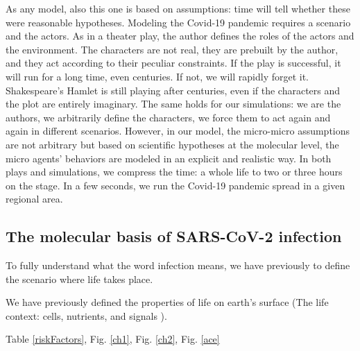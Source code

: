 \documentclass[graybox]{svmult}
\begin{document}
As any model, also this one is based on assumptions: time will tell whether these were reasonable hypotheses. Modeling the Covid-19 pandemic requires a scenario and the actors. As in a theater play, the author defines the roles of the actors and the environment. The characters are not real, they are prebuilt by the author, and they act according to their peculiar constraints. If the play is successful, it will run for a long time, even centuries. If not, we will rapidly forget it. Shakespeare’s Hamlet is still playing after centuries, even if the characters and the plot are entirely imaginary. The same holds for our simulations: we are the authors, we arbitrarily define the characters, we force them to act again and again in different scenarios. However, in our model, the micro-micro assumptions are not arbitrary but based on scientific hypotheses at the molecular level, the micro agents’ behaviors are modeled in an explicit and realistic way. In both plays and simulations, we compress the time: a whole life to two or three hours on the stage. In a few seconds, we run the Covid-19 pandemic spread in a given regional area.



\subsection{The molecular basis of SARS-CoV-2 infection}
\label{biochem}

To fully understand what the word infection means, we have previously to define the scenario where life takes place.

We have previously defined the properties of life on earth's surface (The life context: cells, nutrients, and signals \cite{pescarmona2002life}).

Table \ref{riskFactors}, Fig. \ref{ch1}, Fig. \ref{ch2}, Fig. \ref{ace}
\end{document}
